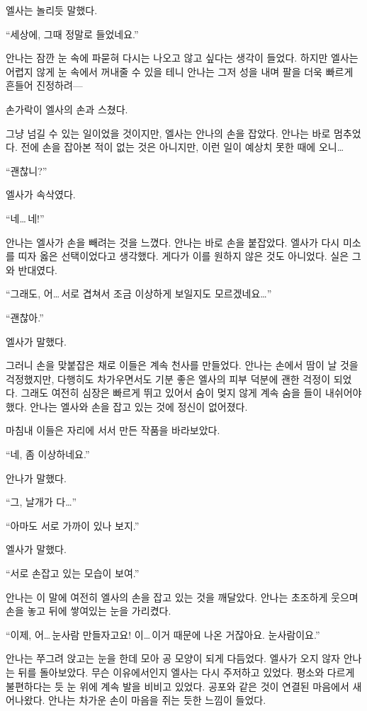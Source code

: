 엘사는 놀리듯 말했다.

``세상에, 그때 정말로 들었네요.''

안나는 잠깐 눈 속에 파묻혀 다시는 나오고 않고 싶다는 생각이 들었다. 하지만 엘사는 어렵지 않게 눈 속에서 꺼내줄 수 있을 테니 안나는 그저 성을 내며 팔을 더욱 빠르게 흔들어 진정하려—

손가락이 엘사의 손과 스쳤다.

그냥 넘길 수 있는 일이었을 것이지만, 엘사는 안나의 손을 잡았다. 안나는 바로 멈추었다. 전에 손을 잡아본 적이 없는 것은 아니지만, 이런 일이 예상치 못한 때에 오니\ldots

``괜찮니?''

엘사가 속삭였다.

``네\ldots\,네!''

안나는 엘사가 손을 빼려는 것을 느꼈다. 안나는 바로 손을 붙잡았다. 엘사가 다시 미소를 띠자 옳은 선택이었다고 생각했다. 게다가 이를 원하지 않은 것도 아니었다. 실은 그와 반대였다.

``그래도, 어\ldots\,서로 겹쳐서 조금 이상하게 보일지도 모르겠네요\ldots''

``괜찮아.''

엘사가 말했다.

그러니 손을 맞붙잡은 채로 이들은 계속 천사를 만들었다. 안나는 손에서 땀이 날 것을 걱정했지만, 다행히도 차가우면서도 기분 좋은 엘사의 피부 덕분에 괜한 걱정이 되었다. 그래도 여전히 심장은 빠르게 뛰고 있어서 숨이 멎지 않게 계속 숨을 들이 내쉬어야 했다. 안나는 엘사와 손을 잡고 있는 것에 정신이 없어졌다.

마침내 이들은 자리에 서서 만든 작품을 바라보았다.

``네, 좀 이상하네요.''

안나가 말했다.

``그, 날개가 다\ldots''

``아마도 서로 가까이 있나 보지.''

엘사가 말했다.

``서로 손잡고 있는 모습이 보여.''

안나는 이 말에 여전히 엘사의 손을 잡고 있는 것을 깨달았다. 안나는 초조하게 웃으며 손을 놓고 뒤에 쌓여있는 눈을 가리켰다.

``이제, 어\ldots\,눈사람 만들자고요! 이\ldots\,이거 때문에 나온 거잖아요. 눈사람이요.''

안나는 쭈그려 앉고는 눈을 한데 모아 공 모양이 되게 다듬었다. 엘사가 오지 않자 안나는 뒤를 돌아보았다. 무슨 이유에서인지 엘사는 다시 주저하고 있었다. 평소와 다르게 불편하다는 듯 눈 위에 계속 발을 비비고 있었다. 공포와 같은 것이 연결된 마음에서 새어나왔다. 안나는 차가운 손이 마음을 쥐는 듯한 느낌이 들었다.


